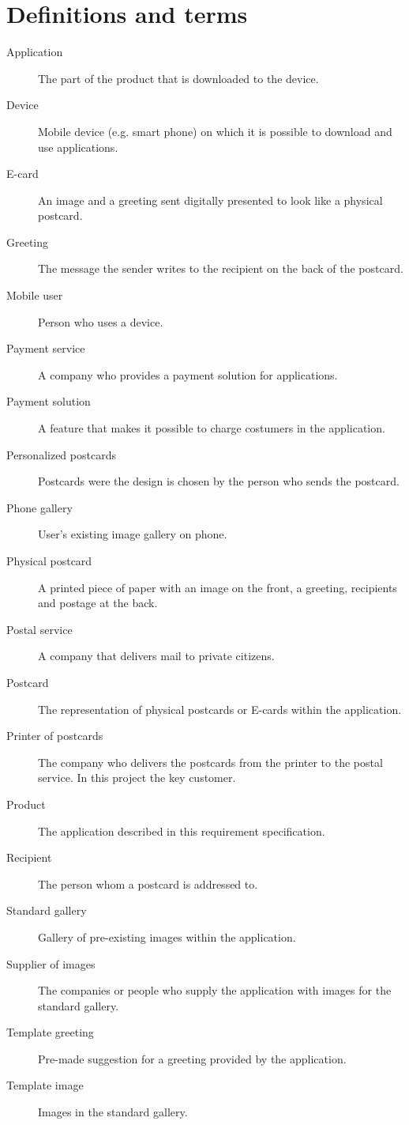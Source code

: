 \documentclass[10pt,a4paper]{article}
\begin{document}

\section{Definitions and terms}
\begin{description}
\item [Application] The part of the product that is downloaded to the device.
\item[Device] Mobile device (e.g. smart phone) on which it is possible to download and use applications.
\item [E-card] An image and a greeting sent digitally presented to look like a physical postcard.
\item[Greeting] The message the sender writes to the recipient on the back of the postcard.
\item[Mobile user] Person who uses a device. 
\item[Payment service] A company who provides a payment solution for applications. 
\item[Payment solution] A feature that makes it possible to charge costumers in the application. 
\item[Personalized postcards] Postcards were the design is chosen by the person who sends the postcard. 
\item[Phone gallery] User's existing image gallery on phone.
\item [Physical postcard] A printed piece of paper with an image on the front, a greeting, recipients and postage at the back. 
\item[Postal service] A company that delivers mail to private citizens.
\item [Postcard] The representation of physical postcards or E-cards within the application. 
\item[Printer of postcards] The company who delivers the postcards from the printer to the postal service. In this project the key customer.
\item[Product]The application described in this requirement specification.
\item[Recipient]The person whom a postcard is addressed to.
\item[Standard gallery] Gallery of pre-existing images within the application.
\item[Supplier of images] The companies or people who supply the application with images for the standard gallery.
\item [Template greeting] Pre-made suggestion for a greeting provided by the application. 
\item [Template image] Images in the standard gallery. 
\end{description}
\end{document}
